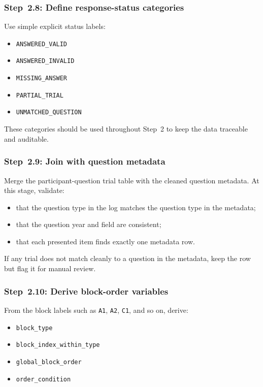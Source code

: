\subsubsection{Step~2.8: Define response-status categories}
Use simple explicit status labels:
\begin{itemize}
    \item \texttt{ANSWERED\_VALID}
    \item \texttt{ANSWERED\_INVALID}
    \item \texttt{MISSING\_ANSWER}
    \item \texttt{PARTIAL\_TRIAL}
    \item \texttt{UNMATCHED\_QUESTION}
\end{itemize}

These categories should be used throughout Step~2 to keep the data traceable and auditable.

\subsubsection{Step~2.9: Join with question metadata}
Merge the participant-question trial table with the cleaned question metadata.
At this stage, validate:
\begin{itemize}
    \item that the question type in the log matches the question type in the metadata;
    \item that the question year and field are consistent;
    \item that each presented item finds exactly one metadata row.
\end{itemize}

If any trial does not match cleanly to a question in the metadata, keep the row but flag it for manual review.

\subsubsection{Step~2.10: Derive block-order variables}
From the block labels such as \texttt{A1}, \texttt{A2}, \texttt{C1}, and so on, derive:
\begin{itemize}
    \item \texttt{block\_type}
    \item \texttt{block\_index\_within\_type}
    \item \texttt{global\_block\_order}
    \item \texttt{order\_condition}
\end{itemize}

